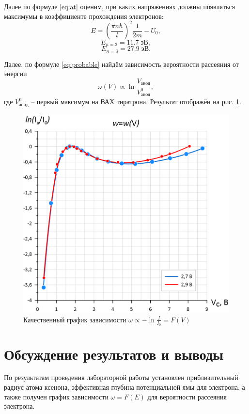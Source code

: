 \documentclass[a4paper, 12pt]{article}
\begin{document}
Далее по формуле \eqref{eq:at} оценим, при каких напряжениях должны появляться максимумы в коэффициенте прохождения электронов:
\[
	E = \left(\frac{\pi n \hbar}{l}\right)^2 \frac{1}{2 m} - U_0,
\]
\[  E_{n=2}= 11.7 \; эВ,\]
\[  E_{n=3} = 27.9 \; эВ. \]

Далее, по формуле \eqref{eq:probable} найдём зависимость вероятности рассеяния от энергии
\[\omega(V) \propto \ln \frac{V_{анод}}{V_{анод}^0},\] где $ V_{анод}^0 $ -- первый максимум на ВАХ тиратрона. Результат отображён на рис. \ref{fig:plot2}.

\begin{figure}[h!]
\begin{center}
    \includegraphics[width=0.6\linewidth]{plot2.png}
\end{center}
\caption{Качественный график зависимости $ \omega \propto -\ln \frac{I}{I_0} = F(V) $}
\label{fig:plot2}
\end{figure}

\newpage

\section{Обсуждение результатов и выводы}

По результатам проведения лабораторной работы установлен приблизительный радиус атома ксенона, эффективная глубина потенциальной ямы для электрона, а также получен график зависимости $ \omega = F(E) $ для вероятности рассеяния электрона.
\end{document}
